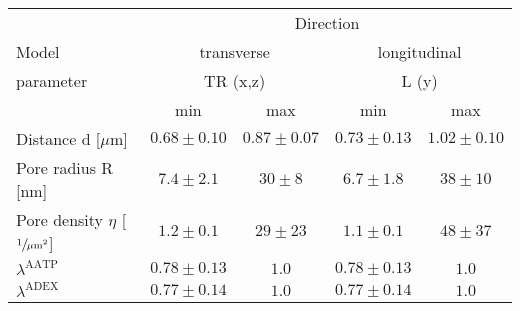\begin{tabular}{lcccc}

  \hline
  & \multicolumn{4}{c}{Direction} \\
  Model & \multicolumn{2}{c}{transverse} &
  \multicolumn{2}{c}{longitudinal} \\ 
  parameter& \multicolumn{2}{c}{TR (x,z)} & \multicolumn{2}{c}{L (y)} \\
  &min&max&min&max\\
  \hline
  Distance d [$\mu$m] & $0.68\pm 0.10$ & $0.87\pm 0.07$ &
  $0.73\pm 0.13$&$1.02\pm 0.10$ \\
  Pore radius R [nm]  & $7.4 \pm 2.1$ & $30 \pm 8$&
  $6.7\pm 1.8 $&$38\pm 10$\\
  Pore density $\eta$ [$\sfrac{1}{\mu \mathrm{m}^2}$] & $1.2 \pm 0.1$ &
  $29 \pm 23$ & $1.1\pm 0.1$ & $48\pm37$ \\
  $\lambda^{\mathrm{AATP}}$ & $0.78 \pm 0.13$ & $1.0$&$0.78 \pm 0.13$ &$1.0$ \\
  $\lambda^{\mathrm{ADEX}}$ & $0.77 \pm 0.14$ & $1.0$&$0.77 \pm 0.14$ &$1.0$ 
\end{tabular}
